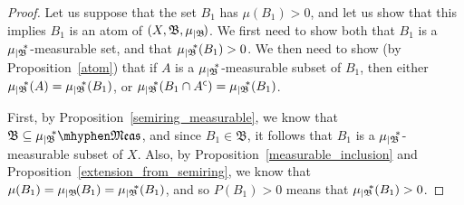 \documentclass[
twoside=true,
paper=letter,
fontsize=9pt,
pagesize=auto,
leqno,
openany,
headsepline,
overfullrule,
]{scrbook}
\theoremstyle{plain}
\theoremstyle{plain}
\theoremstyle{definition}
\theoremstyle{bfnoteitalic}
\theoremstyle{bfnoteroman}
\newcommand{\sigalg}[1]{\mathfrak{#1}}
\newcommand{\restrictedto}[1]{_{\lvert#1}\kern-1.5pt}
\newcommand{\comp}{^{\hbox{\tiny{$\mathsf C$}}}}
\newcommand{\meets}{\cap}
\newcommand{\sigmaalgebraii}{\sigalg{B}}
\newcommand{\measurable}[1]{{#1}\mhyphen\mathfrak{Meas}}
\newcommand{\Psubstar}[1]{\measure\restrictedto{#1}\kern-2pt^*}
\newcommand{\sigalgb}{\sigmaalgebraii}
\newcommand{\measurespace}{X}
\newcommand{\measure}{\mu}
\begin{document}
\begin{proof} 
Let us suppose that the set $B_1$ has $\measure(B_1)> 0$, and let us show that this implies $B_1$ is an atom of
$(\measurespace, \sigalgb,\measure\restrictedto{\sigalgb})$.
We first need to show both that $B_1$ is a $\Psubstar{\sigalgb}$-measurable set, and that $\Psubstar{\sigalgb}(B_1)>0$. We then need to show (by Proposition~\ref{atom}) that if $A$ is a $\Psubstar{\sigalgb}$-measurable subset of $B_1$, then either $\Psubstar{\sigalgb}(A) = \Psubstar{\sigalgb}(B_1)$, 
or 
$\Psubstar{\sigalgb}(B_1\meets A\comp) = \Psubstar{\sigalgb}(B_1)$. 

First, by Proposition~\ref{semiring_measurable}, we know that 
$\sigalgb\subseteq \measurable{\Psubstar{\sigalgb}}$, and since $B_1\in \sigalgb$, it follows that $B_1$ is a $\Psubstar{\sigalgb}$-measurable subset of $\measurespace$. Also, by Proposition~\ref{measurable_inclusion}  and Proposition~\ref{extension_from_semiring}, we know that 
$\measure(B_1) = 
\measure\restrictedto{\sigalgb}(B_1) =
\Psubstar{\sigalgb}(B_1)$, and so $P(B_1) > 0$ means that  
$\Psubstar{\sigalgb}(B_1) > 0$.


\end{proof}
\end{document}
